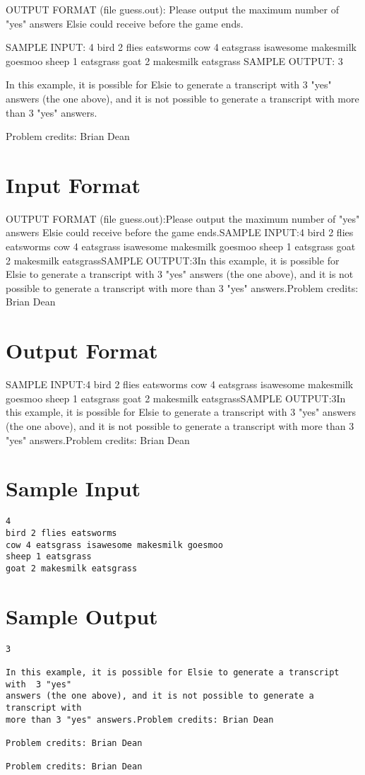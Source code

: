 \documentclass[12pt]{article}
\begin{document}
OUTPUT FORMAT (file guess.out):
Please output the maximum number of "yes" answers Elsie could receive before the
game ends.

SAMPLE INPUT:
4
bird 2 flies eatsworms
cow 4 eatsgrass isawesome makesmilk goesmoo
sheep 1 eatsgrass
goat 2 makesmilk eatsgrass
SAMPLE OUTPUT: 
3

In this example, it is possible for Elsie to generate a transcript with  3 "yes"
answers (the one above), and it is not possible to generate a transcript with
more than 3 "yes" answers.


Problem credits: Brian Dean



\section*{Input Format}
OUTPUT FORMAT (file guess.out):Please output the maximum number of "yes" answers Elsie could receive before the
game ends.SAMPLE INPUT:4
bird 2 flies eatsworms
cow 4 eatsgrass isawesome makesmilk goesmoo
sheep 1 eatsgrass
goat 2 makesmilk eatsgrassSAMPLE OUTPUT:3In this example, it is possible for Elsie to generate a transcript with  3 "yes"
answers (the one above), and it is not possible to generate a transcript with
more than 3 "yes" answers.Problem credits: Brian Dean

\section*{Output Format}
SAMPLE INPUT:4
bird 2 flies eatsworms
cow 4 eatsgrass isawesome makesmilk goesmoo
sheep 1 eatsgrass
goat 2 makesmilk eatsgrassSAMPLE OUTPUT:3In this example, it is possible for Elsie to generate a transcript with  3 "yes"
answers (the one above), and it is not possible to generate a transcript with
more than 3 "yes" answers.Problem credits: Brian Dean

\section*{Sample Input}
\begin{verbatim}
4
bird 2 flies eatsworms
cow 4 eatsgrass isawesome makesmilk goesmoo
sheep 1 eatsgrass
goat 2 makesmilk eatsgrass
\end{verbatim}

\section*{Sample Output}
\begin{verbatim}
3

In this example, it is possible for Elsie to generate a transcript with  3 "yes"
answers (the one above), and it is not possible to generate a transcript with
more than 3 "yes" answers.Problem credits: Brian Dean

Problem credits: Brian Dean

Problem credits: Brian Dean
\end{verbatim}
\end{document}
